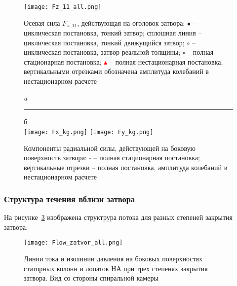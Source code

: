 \begin{figure}[p!]
  \centering \texttt{[image: Fz\_11\_all.png]}\\  
  \caption{Осевая сила $F_{z,\, 11}$, действующая на оголовок затвора: $\bullet$ -- циклическая постановка, 
           тонкий затвор; сплошная линия -- циклическая постановка, тонкий движущийся затвор; 
           $\circ$ -- циклическая постановка, затвор реальной толщины; $\square$ -- полная стационарная 
           постановка; \textcolor{red}{$\blacktriangle$} -- полная нестационарная постановка; вертикальными 
           отрезками обозначена амплитуда колебаний в нестационарном расчете}
  \label{fig:7}
\end{figure}
\begin{figure}[p!]
  \centering \small \emph{a}\rule{90mm}{0mm}\emph{б}\\[1.5mm]
  {\texttt{[image: Fx\_kg.png]}}\hfill
  {\texttt{[image: Fy\_kg.png]}}\\  
  \caption{Компоненты   радиальной силы, действующей на боковую поверхность 
  затвора: $\square$ -- полная стационарная 
  постановка; вертикальные отрезки -- полная постановка, амплитуда колебаний в нестационарном расчете}
  \label{fig:8}
\end{figure}
\clearpage

\subsubsection{Структура течения вблизи затвора}
\label{s:4524}
На рисунке~\ref{fig:65} изображена структрура потока для разных степеней закрытия затвора. 
\begin{figure}[h!]
  \centering 
  \texttt{[image: Flow\_zatvor\_all.png]}\\
  \caption{Линии тока и изолинии давления на боковых поверхностях статорных колонн и лопаток НА 
           при трех степенях закрытия затвора. Вид со стороны спиральной камеры}
  \label{fig:65}
\end{figure}
